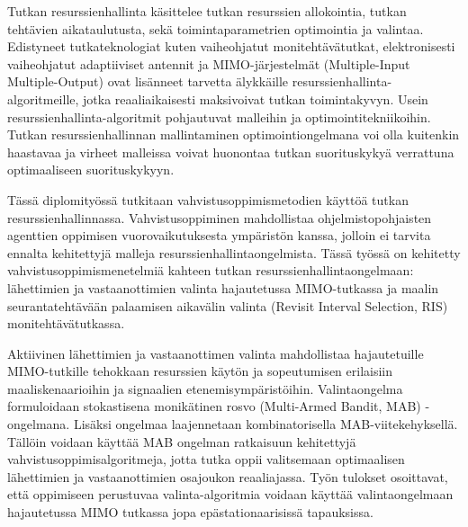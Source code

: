 \documentclass[english, 12pt, a4paper, elec, utf8, a-1b, online]{aaltothesis}
\numberwithin{equation}{section}
\begin{document}
\newpage
\begin{abstractpage}[finnish]
Tutkan resurssienhallinta käsittelee tutkan resurssien allokointia, tutkan tehtävien aikataulutusta, sekä toimintaparametrien optimointia ja valintaa.
Edistyneet tutkateknologiat kuten vaiheohjatut monitehtävätutkat, elektronisesti vaiheohjatut adaptiiviset antennit ja MIMO-järjestelmät (Multiple-Input Multiple-Output) ovat lisänneet tarvetta älykkäille resurssienhallinta-algoritmeille, jotka reaaliaikaisesti maksivoivat tutkan toimintakyvyn. 
Usein resurssienhallinta-algoritmit pohjautuvat malleihin ja optimointitekniikoihin. Tutkan resurssienhallinnan mallintaminen optimointiongelmana voi olla kuitenkin haastavaa ja virheet malleissa voivat huonontaa tutkan suorituskykyä verrattuna optimaaliseen suorituskykyyn.

Tässä diplomityössä tutkitaan vahvistusoppimismetodien käyttöä tutkan resurssienhallinnassa.
Vahvistusoppiminen mahdollistaa ohjelmistopohjaisten agenttien oppimisen vuorovaikutuksesta ympäristön kanssa, jolloin ei tarvita ennalta kehitettyjä malleja resurssienhallintaongelmista.
Tässä työssä on kehitetty vahvistusoppimismenetelmiä kahteen tutkan resurssienhallintaongelmaan: lähettimien ja vastaanottimien valinta hajautetussa MIMO-tutkassa ja maalin seurantatehtävään palaamisen aikavälin valinta (Revisit Interval Selection, RIS) monitehtävätutkassa.

Aktiivinen lähettimien ja vastaanottimen valinta mahdollistaa hajautetuille MIMO-tutkille tehokkaan resurssien käytön ja sopeutumisen erilaisiin maaliskenaarioihin ja signaalien etenemisympäristöihin. 
Valintaongelma formuloidaan stokastisena monikätinen rosvo (Multi-Armed Bandit, MAB)
-ongelmana. 
Lisäksi ongelmaa laajennetaan kombinatorisella MAB-viitekehyksellä. Tällöin voidaan käyttää MAB ongelman ratkaisuun kehitettyjä vahvistusoppimisalgoritmeja, jotta tutka oppii valitsemaan optimaalisen lähettimien ja vastaanottimien osajoukon reaaliajassa. 
Työn tulokset osoittavat, että oppimiseen perustuvaa valinta-algoritmia voidaan käyttää valintaongelmaan hajautetussa MIMO tutkassa jopa epästationaarisissä tapauksissa.


\end{abstractpage}
\end{document}
